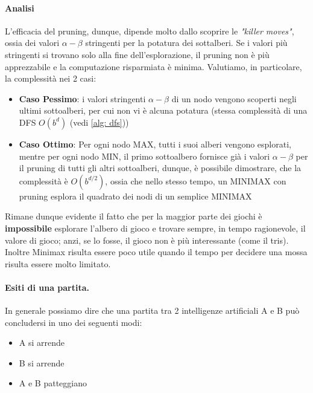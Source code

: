 \paragraph{Analisi}
L'efficacia del pruning, dunque, dipende molto dallo scoprire le \textit{"killer moves"}, ossia dei valori $\alpha-\beta$ stringenti per la potatura dei sottalberi. 
Se i valori più stringenti si trovano solo alla fine dell'esplorazione, il pruning non è più apprezzabile e la computazione risparmiata è minima.
Valutiamo, in particolare, la complessità nei 2 casi:
\begin{itemize}
    \item \textbf{Caso Pessimo}: i valori stringenti $\alpha-\beta$ di un nodo vengono scoperti negli ultimi sottoalberi, per cui non vi è alcuna potatura (stessa complessità di una DFS $O(b^d)$ (vedi \ref{alg: dfs}))
    \item \textbf{Caso Ottimo}: Per ogni nodo MAX, tutti i suoi alberi vengono esplorati, mentre per ogni nodo MIN, il primo sottoalbero fornisce già i valori $\alpha-\beta$ per il pruning di tutti gli altri sottoalberi,
    dunque, è possibile dimostrare, che la complessità è $O(b^{d/2})$, ossia che nello stesso tempo, un MINIMAX con pruning esplora il quadrato dei nodi di un semplice MINIMAX
\end{itemize}
Rimane dunque evidente il fatto che per la maggior parte dei giochi è \textbf{impossibile} esplorare l'albero di gioco e trovare sempre, 
in tempo ragionevole, il valore di gioco; anzi, se lo fosse, il gioco non è più interessante (come il tris). Inoltre Minimax risulta essere poco utile quando il tempo per decidere
una mossa risulta essere molto limitato.
\paragraph{Esiti di una partita.} In generale possiamo dire che una partita tra 2 intelligenze artificiali A e B può concludersi in uno dei seguenti modi:
\begin{itemize}
    \item A si arrende
    \item B si arrende
    \item A e B patteggiano
\end{itemize} 

